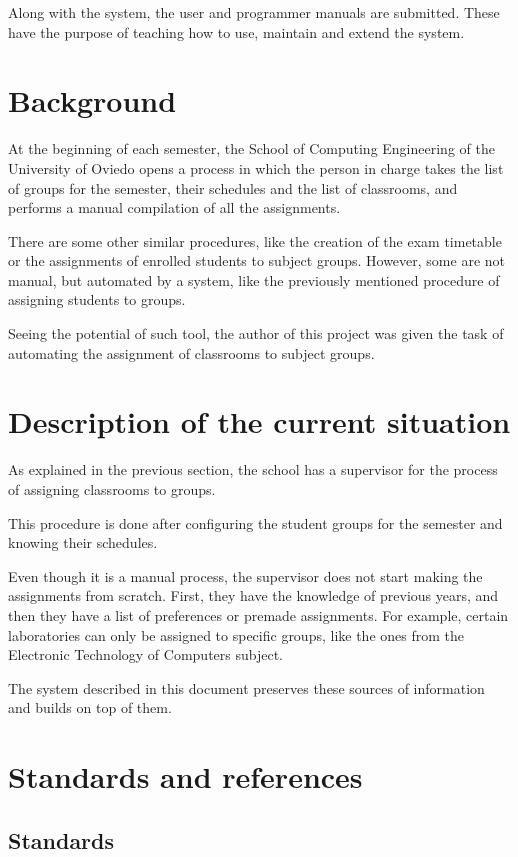 Along with the system, the user and programmer manuals are submitted. These have the purpose of teaching how to use, maintain and extend the system.

\section{Background}

At the beginning of each semester, the School of Computing Engineering of the University of Oviedo opens a process in which the person in charge takes the list of groups for the semester, their schedules and the list of classrooms, and performs a manual compilation of all the assignments.

There are some other similar procedures, like the creation of the exam timetable or the assignments of enrolled students to subject groups. However, some are not manual, but automated by a system, like the previously mentioned procedure of assigning students to groups.

Seeing the potential of such tool, the author of this project was given the task of automating the assignment of classrooms to subject groups. 

\section{Description of the current situation}

As explained in the previous section, the school has a supervisor for the process of assigning classrooms to groups.

This procedure is done after configuring the student groups for the semester and knowing their schedules.

Even though it is a manual process, the supervisor does not start making the assignments from scratch. First, they have the knowledge of previous years, and then they have a list of preferences or premade assignments. For example, certain laboratories can only be assigned to specific groups, like the ones from the Electronic Technology of Computers subject.

The system described in this document preserves these sources of information and builds on top of them.

\section{Standards and references}

\subsection{Standards}

